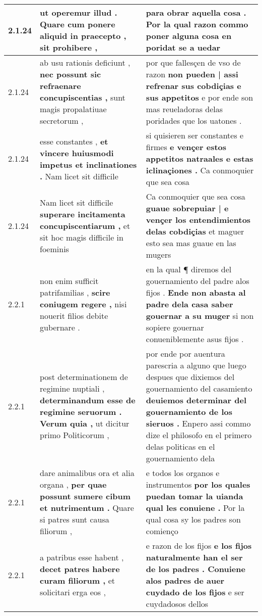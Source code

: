 \begin{tabular}{|p{1cm}|p{6.5cm}|p{6.5cm}|}
2.1.24 & ut operemur illud . \textbf{ Quare cum ponere aliquid in praecepto , } sit prohibere , & para obrar aquella cosa . \textbf{ Por la qual razon commo poner alguna cosa } en poridat se a uedar \\\hline
2.1.24 & ab usu rationis deficiunt , \textbf{ nec possunt sic refraenare concupiscentias , } sunt magis propalatiuae secretorum , & por que fallesçen de vso de razon \textbf{ non pueden | assi refrenar sus cobdiçias e sus appetitos } e por ende son mas reueladoras delas poridades que los uatones . \\\hline
2.1.24 & esse constantes , \textbf{ et vincere huiusmodi impetus et inclinationes . } Nam licet sit difficile & si quisieren ser constantes e firmes \textbf{ e vençer estos appetitos natraales e estas iclinaçiones . } Ca conmoquier que sea cosa \\\hline
2.1.24 & Nam licet sit difficile \textbf{ superare incitamenta concupiscentiarum , } et sit hoc magis difficile in foeminis & Ca conmoquier que sea cosa \textbf{ guaue sobrepuiar | e vençer los entendimientos delas cobdiçias } et maguer esto sea mas guaue en las mugers \\\hline
2.2.1 & non enim sufficit patrifamilias , \textbf{ scire coniugem regere , } nisi nouerit filios debite gubernare . & en la qual ¶ diremos del gouernamiento del padre alos fijos . \textbf{ Ende non abasta al padre dela casa saber gouernar a su muger } si non sopiere gouernar conueniblemente asus fijos . \\\hline
2.2.1 & post determinationem de regimine nuptiali , \textbf{ determinandum esse de regimine seruorum . Verum quia , } ut dicitur primo Politicorum , & por ende por auentura parescria a alguno que luego despues que dixiemos del gouernamiento del casamiento \textbf{ deuiemos determinar del gouernamiento de los sieruos . } Enpero assi commo dize el philosofo en el primero delas politicas en el gouernamiento dela \\\hline
2.2.1 & dare animalibus ora et alia organa , \textbf{ per quae possunt sumere cibum et nutrimentum . } Quare si patres sunt causa filiorum , & e todos los organos e instrumentos \textbf{ por los quales puedan tomar la uianda qual les conuiene . } Por la qual cosa sy los padres son comienço \\\hline
2.2.1 & a patribus esse habent , \textbf{ decet patres habere curam filiorum , } et solicitari erga eos , & e razon de los fijos \textbf{ e los fijos naturalmente han el ser de los padres . Conuiene alos padres de auer cuydado de los fijos } e ser cuydadosos dellos \\\hline

\end{tabular}
